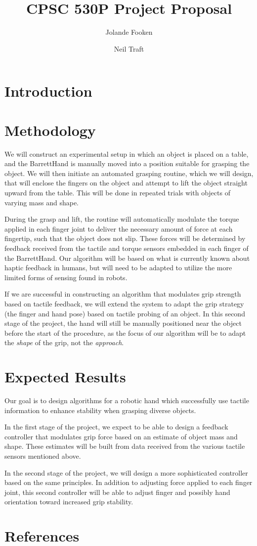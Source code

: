 \documentclass[12pt, oneside]{article}
\title{CPSC 530P Project Proposal}
\author{
  Jolande Fooken
  \and
  Neil Traft
}
\begin{document}
\maketitle

\section*{Introduction}

\section*{Methodology}
We will construct an experimental setup in which an object is placed on a table, and the BarrettHand is manually moved into a position suitable for grasping the object. We will then initiate an automated grasping routine, which we will design, that will enclose the fingers on the object and attempt to lift the object straight upward from the table. This will be done in repeated trials with objects of varying mass and shape.

During the grasp and lift, the routine will automatically modulate the torque applied in each finger joint to deliver the necessary amount of force at each fingertip, such that the object does not slip. These forces will be determined by feedback received from the tactile and torque sensors embedded in each finger of the BarrettHand. Our algorithm will be based on what is currently known about haptic feedback in humans, but will need to be adapted to utilize the more limited forms of sensing found in robots.

If we are successful in constructing an algorithm that modulates grip strength based on tactile feedback, we will extend the system to adapt the grip strategy (the finger and hand pose) based on tactile probing of an object. In this second stage of the project, the hand will still be manually positioned near the object before the start of the procedure, as the focus of our algorithm will be to adapt the \emph{shape} of the grip, not the \emph{approach}.

\section*{Expected Results}
Our goal is to design algorithms for a robotic hand which successfully use tactile information to enhance stability when grasping diverse objects.

In the first stage of the project, we expect to be able to design a feedback controller that modulates grip force based on an estimate of object mass and shape. These estimates will be built from data received from the various tactile sensors mentioned above.

In the second stage of the project, we will design a more sophisticated controller based on the same principles. In addition to adjusting force applied to each finger joint, this second controller will be able to adjust finger and possibly hand orientation toward increased grip stability.

\section*{References}
\end{document}

